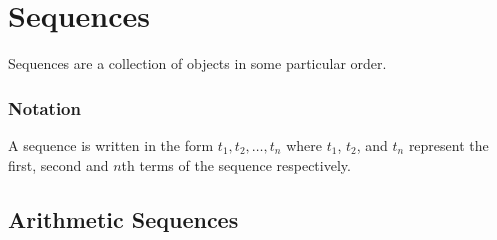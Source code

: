 \section{Sequences}

Sequences are a collection of objects in some particular order.

\subsubsection{Notation}

A sequence is written in the form $t_1, t_2, \dots, t_n$ where $t_1$, $t_2$, and $t_n$ represent the first, second and $n$th terms of the sequence respectively. \\


\subsection{Arithmetic Sequences}



